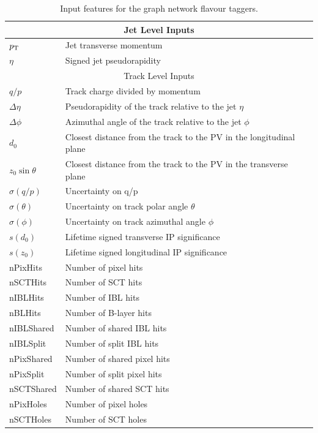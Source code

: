 \begin{table}[h]
    \centering
    \begin{tabular}{ll}
        \toprule
        \midrule
        \multicolumn{2}{c}{Jet Level Inputs} \\
        \midrule
        $p_{\text{T}}$ & Jet transverse momentum \\
        $\eta$ & Signed jet pseudorapidity \\
        \midrule
        \midrule
        \multicolumn{2}{c}{Track Level Inputs} \\
        \midrule
        $q/p$ & Track charge divided by momentum \\
        $\Delta\eta$ & Pseudorapidity of the track relative to the jet $\eta$ \\
        $\Delta\phi$ & Azimuthal angle of the track relative to the jet $\phi$ \\
        $d_0$ & Closest distance from the track to the PV in the longitudinal plane \\
        $z_0 \sin \theta$ & Closest distance from the track to the PV in the transverse plane \\
        $\sigma(q/p)$ & Uncertainty on q/p \\
        $\sigma(\theta)$ & Uncertainty on track polar angle $\theta$ \\
        $\sigma(\phi)$ & Uncertainty on track azimuthal angle $\phi$ \\
        $s(d_0)$ & Lifetime signed transverse IP significance \\
        $s(z_0)$ & Lifetime signed longitudinal IP significance \\
        nPixHits & Number of pixel hits \\
        nSCTHits & Number of SCT hits \\
        nIBLHits & Number of IBL hits \\
        nBLHits & Number of B-layer hits \\
        nIBLShared & Number of shared IBL hits \\
        nIBLSplit & Number of split IBL hits \\
        nPixShared & Number of shared pixel hits \\
        nPixSplit & Number of split pixel hits \\
        nSCTShared & Number of shared SCT hits \\
        nPixHoles & Number of pixel holes \\
        nSCTHoles & Number of SCT holes \\
        \bottomrule
    \end{tabular}
    \caption{Input features for the graph network flavour taggers.}
    \label{tab:track_features}
\end{table}

